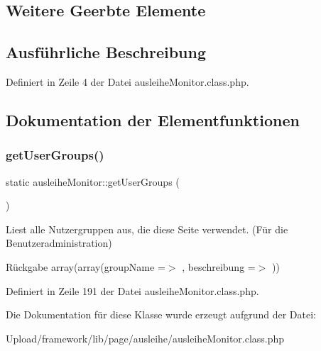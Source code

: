 \subsection*{Weitere Geerbte Elemente}


\subsection{Ausführliche Beschreibung}


Definiert in Zeile 4 der Datei ausleihe\+Monitor.\+class.\+php.



\subsection{Dokumentation der Elementfunktionen}
\mbox{\label{classausleihe_monitor_a46042bfbc217f7837e7b01720a5f315e}} 
\subsubsection{\texorpdfstring{get\+User\+Groups()}{getUserGroups()}}
{\footnotesize\ttfamily static ausleihe\+Monitor\+::get\+User\+Groups (\begin{DoxyParamCaption}{ }\end{DoxyParamCaption})\hspace{0.3cm}{\ttfamily [static]}}

Liest alle Nutzergruppen aus, die diese Seite verwendet. (Für die Benutzeradministration) \begin{DoxyReturn}{Rückgabe}
array(array(\textquotesingle{}group\+Name\textquotesingle{} =$>$ \textquotesingle{}\textquotesingle{}, \textquotesingle{}beschreibung\textquotesingle{} =$>$ \textquotesingle{}\textquotesingle{})) 
\end{DoxyReturn}


Definiert in Zeile 191 der Datei ausleihe\+Monitor.\+class.\+php.



Die Dokumentation für diese Klasse wurde erzeugt aufgrund der Datei\+:\begin{DoxyCompactItemize}
\item 
Upload/framework/lib/page/ausleihe/ausleihe\+Monitor.\+class.\+php\end{DoxyCompactItemize}
